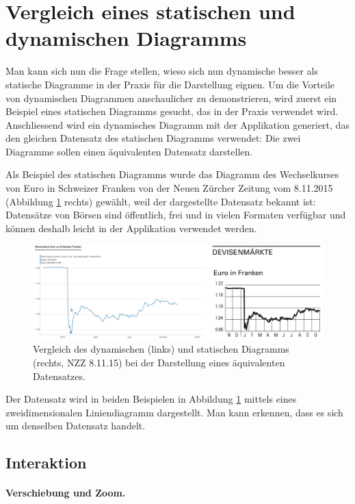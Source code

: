 \section{Vergleich eines statischen und dynamischen Diagramms}

Man kann sich nun die Frage stellen, wieso sich nun dynamische besser als statische Diagramme in der Praxis für die Darstellung eignen. Um die Vorteile von dynamischen Diagrammen anschaulicher zu demonstrieren, wird zuerst ein Beispiel eines statischen Diagramms gesucht, das in der Praxis verwendet wird. Anschliessend wird ein dynamisches Diagramm mit der Applikation generiert, das den gleichen Datensatz des statischen Diagramms verwendet: Die zwei Diagramme sollen einen äquivalenten Datensatz darstellen.

Als Beispiel des statischen Diagramms wurde das Diagramm des Wechselkurses von Euro in Schweizer Franken von der Neuen Zürcher Zeitung vom 8.11.2015 (Abbildung \ref{fig:finance} rechts) gewählt, weil der dargestellte Datensatz bekannt ist: Datensätze von Börsen sind öffentlich, frei und in vielen Formaten verfügbar und können deshalb leicht in der Applikation verwendet werden.

\begin{figure}[H]
	\centering
	\includegraphics[width=\linewidth]{images/finance}
	\caption[Vergleich des dynamischen und statischen Diagramms]{Vergleich des dynamischen (links) und statischen Diagramms (rechts, NZZ 8.11.15) bei der Darstellung eines äquivalenten Datensatzes.}
	\label{fig:finance}
\end{figure}

Der Datensatz wird in beiden Beispielen in Abbildung \ref{fig:finance} mittels eines zweidimensionalen Liniendiagramm dargestellt. Man kann erkennen, dass es sich um denselben Datensatz handelt.

\subsection{Interaktion}

\paragraph{Verschiebung und Zoom.}

